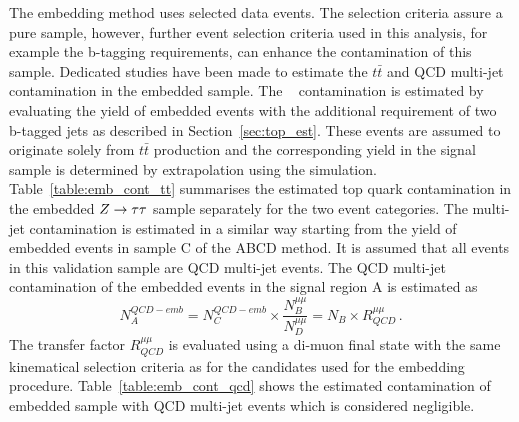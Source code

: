 The embedding method uses selected \Zmumu data events. The \Zmumu selection criteria 
assure a pure \Zmumu sample, however, further event selection criteria used in this analysis, 
for example the b-tagging requirements, can enhance the contamination of this sample. 
Dedicated studies have been made to estimate the $t\bar{t}$ and QCD multi-jet contamination in the embedded sample.
The \ttbar~ contamination is estimated by evaluating the yield of embedded \Ztt events with the additional requirement of 
two b-tagged jets as described in Section~\ref{sec:top_est}. These events are assumed to originate solely from  $t\bar{t}$ production
and the corresponding yield in the signal sample is determined by extrapolation using the simulation.
Table~\ref{table:emb_cont_tt} summarises the estimated top quark contamination in the embedded $Z\rightarrow \tau\tau$ sample
 separately for the two event categories.
The multi-jet contamination is estimated in a similar way  starting 
from the yield of embedded events in  sample C of the ABCD method. 
It is assumed that all events in this validation sample are QCD multi-jet events. The QCD multi-jet contamination 
of the embedded events in the  signal region A is estimated as
\begin{equation} \label{eqn:qcdEmb}
N_{A}^{QCD-emb}  = N_{C}^{QCD-emb} \times \frac{N_{B}^{\mu\mu}}{N_{D}^{\mu\mu}} =  N_{B} \times R_{QCD}^{\mu\mu} \,.
\end{equation}
The transfer factor $R_{QCD}^{\mu\mu}$ is evaluated using a di-muon final state with the same kinematical selection criteria
 as for the \Zmumu candidates used for  the embedding procedure.
Table~\ref{table:emb_cont_qcd} shows the estimated contamination of embedded sample with QCD multi-jet events
which is considered negligible.





